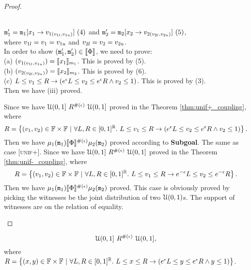 \documentclass[a4paper,11pt]{article}
\begin{document}
\begin{proof}
\begin{itemize}
\begin{subproof}
	\\
	$\mathtt{m}_1' = \mathtt{m}_1[x_1 \to v_{1(v_{1l}, v_{1u})}] ~ (4)$ and
	$\mathtt{m}_2' = \mathtt{m}_2[x_2 \to v_{2(v_{2l}, v_{2u})}] ~ (5)$,
	\\
	where $v_{1l} = v_1 = v_{1u}$ and $v_{2l} = v_2 = v_{2u}$.
	\\
	In order to show $(\mathtt{m}_1', \mathtt{m}_2') \in \llbracket \Phi \rrbracket$, we need to prove:
	\\
	(a)	$(v_{1(v_{1l}, v_{1u})}) = \llbracket x_1 \rrbracket_{m_1}$.
	This is proved by (5).
	\\
	(b) $(v_{2(v_{2l}, v_{2u})}) = \llbracket x_2 \rrbracket_{m_2}$.
	This is proved by (6).
	\\
	(c) $L \leq v_1 \leq R \rightarrow
	(e^{\epsilon} L \leq v_2 \leq 	e^{\epsilon} R
	\land v_2 \leq 1)$.
	This is proved by (3).
	\\
	Then we have (iii) proved. 
	\end{subproof}
	Since we have $\mathcal{U}(0,1] ~ R^{\#(\epsilon)} ~ \mathcal{U}(0,1]$ proved in the Theorem \ref{thm:unif+_coupling},
	where 
	\[
		R = 
		\left \{(v_1, v_2) \in \mathbb{F} \times \mathbb{F} 
		~|~
		\forall L, R \in [0,1]^{\mathbb{R}}. ~
		L \leq v_1 \leq R
		\rightarrow
		(e^{\epsilon} L \leq v_2 \leq 	e^{\epsilon} R
		\land v_2 \leq 1)
		\right \}.
	\]	%
	Then we have $\mu_1(\mathtt{m}_1) \llbracket \Phi \rrbracket^{\#(\epsilon)} \mu_2(\mathtt{m}_2)$ proved according to \textbf{Subgoal}.
	The same as case [\textsc{unif+}].
		Since we have $\mathcal{U}(0,1] ~ R^{\#(\epsilon)} ~ \mathcal{U}(0,1]$ proved in the Theorem \ref{thm:unif-_coupling},
	where 
	\[
		R = 
		\left \{(v_1, v_2) \in \mathbb{F} \times \mathbb{F} 
		~|~
		\forall L, R \in [0,1]^{\mathbb{R}}. ~
		L \leq v_1 \leq R
		\rightarrow
		e^{-\epsilon} L \leq v_2 \leq 	e^{-\epsilon} R
		\right \}.
	\]
	Then we have $\mu_1(\mathtt{m}_1) \llbracket \Phi \rrbracket^{\#(\epsilon)} \mu_2(\mathtt{m}_2)$ proved.
	This case is obviously proved by picking the witnesses be the joint distribution of two $\mathcal{U}(0, 1)$s.
	The support of witnesses are on the relation of equality.
	\end{itemize}
\end{proof}
%
%
\newpage
\begin{thm}
\label{thm:unif+_coupling}
%
$${\mathcal{U}(0,1]} ~ R^{\#(\epsilon)} ~ {\mathcal{U}(0,1]},$$
%
where
	$	R = 
		\left \{(x, y) \in {\mathbb{F}} \times {\mathbb{F}} 
		~|~
		\forall L, R \in [0,1]^{\mathbb{R}}. ~
		L \leq x \leq R
		\rightarrow
		(e^{\epsilon} L \leq y \leq 	e^{\epsilon} R
		\land y \leq 1)
		\right \}
		$.
\end{thm}
\end{document}
